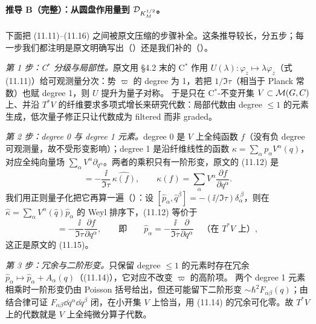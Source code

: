 \paragraph{推导 B（完整）：从圆盘作用量到 \(\mathcal{D}_{K_M^{1/2}}\)。}下面把 (11.11)--(11.16) 之间被原文压缩的步骤补全。这条推导较长，分五步；每一步我们都注明是原文明确写出（\pA）还是我们补的（\pB）。

\emph{第 1 步：C$^*$ 分级与局部性。}原文用 \S4.2 末的 C$^*$ 作用 \(U(\lambda):\varphi_z\mapsto\lambda\varphi_z\)（式 (11.11)）给可观测量分次：势 \(\varpi\) 的 degree 为 1，若把 \(1/\Im\tau\)（相当于 Planck 常数）也赋 degree 1，则 \(U\) 提升为量子对称。\pA{}\pA{} 于是只在 C$^*$-不变开集 \(V\subset\mathcal{M}(G,C)\) 上、并沿 \(T^*V\) 的纤维要求多项式增长来研究代数：局部代数由 degree \(\le1\) 的元素生成，低次量子修正只让代数成为 filtered 而非 graded。\pA{}

\emph{第 2 步：degree 0 与 degree 1 元素。}degree 0 是 \(V\) 上全纯函数 \(f\)（没有负 degree 可观测量，故不受形变影响）；degree 1 是沿纤维线性的函数 \(\kappa=\sum_\alpha p_\alpha V^\alpha(q)\)，对应全纯向量场 \(\sum_\alpha V^\alpha\partial_{q^\alpha}\)。两者的乘积只有一阶形变，原文的 (11.12) 是
\begin{equation}
[\hat\kappa,\hat f]=-\frac{\ii}{\Im\tau}\,\widehat{\kappa(f)},\qquad \kappa(f)=\sum_\alpha V^\alpha\frac{\partial f}{\partial q^\alpha}.
\label{eq:comm-kf}
\end{equation}
\pA{} 我们用正则量子化把它再算一遍（\pB）：设 \([\hat p_\alpha,\hat q^\beta]=-(\ii/\Im\tau)\delta_\alpha^{\ \beta}\)，则在 \(\hat\kappa=\sum_\alpha V^\alpha(\hat q)\hat p_\alpha\) 的 Weyl 排序下，(11.12) 等价于
\begin{equation}
[\hat p_\alpha,\hat f]=-\frac{\ii}{\Im\tau}\frac{\partial f}{\partial q^\alpha},
\qquad\text{即}\qquad
\hat p_\alpha=-\frac{\ii}{\Im\tau}\frac{\partial}{\partial q^\alpha}
\quad\text{（在 }T^*V\text{ 上）},
\label{eq:p-hat}
\end{equation}
这正是原文的 (11.15)。\pA{}

\emph{第 3 步：冗余与二阶形变。}只保留 degree \(\le1\) 的元素时存在冗余 \(\hat p_\alpha\mapsto\hat p_\alpha+A_\alpha(q)\)（(11.14)），它对应不改变 \(\varpi\) 的高阶项。\pA{} 两个 degree 1 元素相乘时一阶形变仍由 Poisson 括号给出，但还可能留下二阶形变 \(\sim\hbar^2F_{\alpha\beta}(q)\)；由结合律可证 \(F_{\alpha\beta}\dd q^\alpha\dd q^\beta\) 闭，在小开集 \(V\) 上恰当，用 (11.14) 的冗余可化零。故 \(T^*V\) 上的代数就是 \(V\) 上全纯微分算子代数。\pB{}

